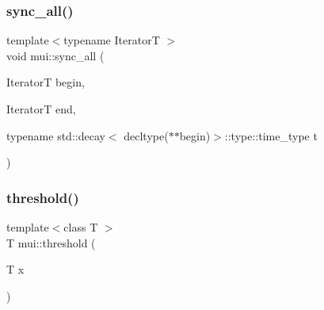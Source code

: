 \mbox{\label{namespacemui_a8f8d926aa60ce9ee8502b1822e5efa90}} 
\subsubsection{\texorpdfstring{sync\+\_\+all()}{sync\_all()}}
{\footnotesize\ttfamily template$<$typename IteratorT $>$ \\
void mui\+::sync\+\_\+all (\begin{DoxyParamCaption}\item[{IteratorT}]{begin,  }\item[{IteratorT}]{end,  }\item[{typename std\+::decay$<$ decltype($\ast$$\ast$begin)$>$\+::type\+::time\+\_\+type}]{t }\end{DoxyParamCaption})}

\mbox{\label{namespacemui_a4d85cef0ffefcf38c4eb3cf62eb2efa2}} 
\subsubsection{\texorpdfstring{threshold()}{threshold()}}
{\footnotesize\ttfamily template$<$class T $>$ \\
T mui\+::threshold (\begin{DoxyParamCaption}\item[{T}]{x }\end{DoxyParamCaption})\hspace{0.3cm}{\ttfamily [inline]}}

